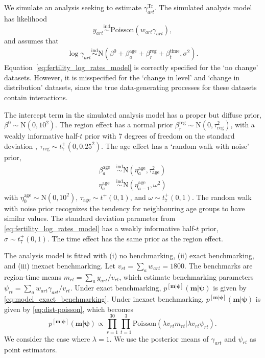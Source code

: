 \documentclass[12pt]{article}
\newcommand{\ind}{\stackrel{\text{ind}}{\sim}}
\begin{document}
We simulate an analysis seeking to estimate $\gamma_{art}^{\text{Tr}}$. The simulated analysis model has likelihood
\begin{equation}
  y_{art} \ind \text{Poisson}( w_{art} \gamma_{art} ), \label{eq:fertility_counts_model}
\end{equation}
and assumes that
\begin{align}
  \log \gamma_{art} \ind \text{N} \left( \beta^0 + \beta_a^{\text{age}} + \beta_r^{\text{reg}} + \beta_t^{\text{time}}, \sigma^2 \right). \label{eq:fertility_log_rates_model}
\end{align}
Equation~\eqref{eq:fertility_log_rates_model} is correctly specified for the `no change' datasets.  However, it is misspecified for the `change in level'  and `change in distribution' datasets, since the true data-generating processes for these datasets contain interactions.

The intercept term in the simulated analysis model has a proper but diffuse prior, $\beta^0 \sim \text{N}(0, 10^2)$.  The region effect has a normal prior $\beta_r^{\text{reg}} \sim \text{N}(0, \tau_{\text{reg}}^2)$, with a weakly informative half-$t$ prior with 7 degrees of freedom on the standard deviation \citep{gelman2008weakly}, $\tau_{\text{reg}} \sim t_7^{+}(0, 0.25^2)$.  The age effect has a `random walk with noise' \citep[][pp.119-120]{prado2010time} prior,
\begin{align}
  \beta_a^{\text{age}} & \ind \text{N}(\eta_a^{\text{age}}, \tau_{\text{age}}^2) \\
  \eta_a^{\text{age}} & \ind \text{N}(\eta_{a-1}^{\text{age}}, \omega^2)
\end{align}
with $\eta_0^{\text{age}} \sim \text{N}(0, 10^2)$, $\tau_{\text{age}} \sim t^{+}(0, 1)$, and $\omega \sim t^{+}_7(0, 1)$.  The random walk with noise prior recognizes the tendency for neighbouring age groups to have similar values.   The standard deviation parameter from \eqref{eq:fertility_log_rates_model} has a weakly informative half-$t$ prior, $\sigma \sim t^{+}_7(0, 1)$. The time effect has the same prior as the region effect.

The analysis model is fitted with (i) no benchmarking, (ii) exact benchmarking, and (iii) inexact benchmarking. Let $v_{rt}=\sum_a w_{art}=1800$.  The benchmarks are region-time means $m_{rt} = \sum_a y_{art} / v_{rt}$, which estimate benchmarking parameters $\psi_{rt} = \sum_a w_{art} \gamma_{art}/ v_{rt}$.
Under exact benchmarking, $p^{[\bm{m}|\bm{\psi}]}(\bm{m} | \bm{\psi})$ is given by \eqref{eq:model_exact_benchmarking}.  Under inexact benchmarking, $p^{[\bm{m}|\bm{\psi}]}(\bm{m} | \bm{\psi})$ is given by \eqref{eq:dist-poisson}, which becomes
\begin{equation}
p^{[\bm{m}|\bm{\psi}]}(\bm{m}|\bm{\psi})\propto \prod_{r=1}^{30} \prod_{t=1}^3 \text{Poisson}(\lambda v_{rt} m_{rt}|  \lambda v_{rt}\psi_{rt}). \label{eq:dist-poisson-fertility}
\end{equation}
We consider the case where $\lambda=1$. We use the posterior means of $\gamma_{art}$ and $\psi_{rt}$ as point estimators.
\end{document}
